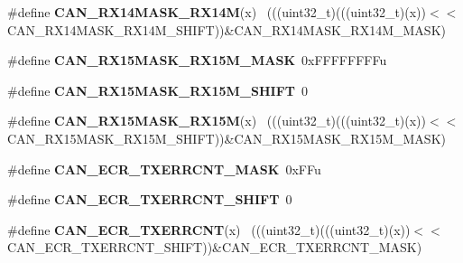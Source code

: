 \begin{DoxyCompactItemize}
\item 
\hypertarget{group___c_a_n___register___masks_gacbd7b6fc756ed286b025102797e7b562}{}\#define {\bfseries C\+A\+N\+\_\+\+R\+X14\+M\+A\+S\+K\+\_\+\+R\+X14\+M}(x)                                    ~(((uint32\+\_\+t)(((uint32\+\_\+t)(x))$<$$<$C\+A\+N\+\_\+\+R\+X14\+M\+A\+S\+K\+\_\+\+R\+X14\+M\+\_\+\+S\+H\+I\+F\+T))\&C\+A\+N\+\_\+\+R\+X14\+M\+A\+S\+K\+\_\+\+R\+X14\+M\+\_\+\+M\+A\+S\+K)\label{group___c_a_n___register___masks_gacbd7b6fc756ed286b025102797e7b562}

\item 
\hypertarget{group___c_a_n___register___masks_gaf81f33076f662d5f4c737076e36e93b7}{}\#define {\bfseries C\+A\+N\+\_\+\+R\+X15\+M\+A\+S\+K\+\_\+\+R\+X15\+M\+\_\+\+M\+A\+S\+K}~0x\+F\+F\+F\+F\+F\+F\+F\+Fu\label{group___c_a_n___register___masks_gaf81f33076f662d5f4c737076e36e93b7}

\item 
\hypertarget{group___c_a_n___register___masks_ga1420efdd894578fe2a31563c25b58e59}{}\#define {\bfseries C\+A\+N\+\_\+\+R\+X15\+M\+A\+S\+K\+\_\+\+R\+X15\+M\+\_\+\+S\+H\+I\+F\+T}~0\label{group___c_a_n___register___masks_ga1420efdd894578fe2a31563c25b58e59}

\item 
\hypertarget{group___c_a_n___register___masks_ga442945803e790f2d1173abcee249ae7e}{}\#define {\bfseries C\+A\+N\+\_\+\+R\+X15\+M\+A\+S\+K\+\_\+\+R\+X15\+M}(x)                                    ~(((uint32\+\_\+t)(((uint32\+\_\+t)(x))$<$$<$C\+A\+N\+\_\+\+R\+X15\+M\+A\+S\+K\+\_\+\+R\+X15\+M\+\_\+\+S\+H\+I\+F\+T))\&C\+A\+N\+\_\+\+R\+X15\+M\+A\+S\+K\+\_\+\+R\+X15\+M\+\_\+\+M\+A\+S\+K)\label{group___c_a_n___register___masks_ga442945803e790f2d1173abcee249ae7e}

\item 
\hypertarget{group___c_a_n___register___masks_gae4da1b026e86291036b8b7d7e78bffa7}{}\#define {\bfseries C\+A\+N\+\_\+\+E\+C\+R\+\_\+\+T\+X\+E\+R\+R\+C\+N\+T\+\_\+\+M\+A\+S\+K}~0x\+F\+Fu\label{group___c_a_n___register___masks_gae4da1b026e86291036b8b7d7e78bffa7}

\item 
\hypertarget{group___c_a_n___register___masks_ga4f1e9e374563ef6c0502d1a441caf396}{}\#define {\bfseries C\+A\+N\+\_\+\+E\+C\+R\+\_\+\+T\+X\+E\+R\+R\+C\+N\+T\+\_\+\+S\+H\+I\+F\+T}~0\label{group___c_a_n___register___masks_ga4f1e9e374563ef6c0502d1a441caf396}

\item 
\hypertarget{group___c_a_n___register___masks_ga821c6b239c15bbb81da5c7abe4c92841}{}\#define {\bfseries C\+A\+N\+\_\+\+E\+C\+R\+\_\+\+T\+X\+E\+R\+R\+C\+N\+T}(x)                                        ~(((uint32\+\_\+t)(((uint32\+\_\+t)(x))$<$$<$C\+A\+N\+\_\+\+E\+C\+R\+\_\+\+T\+X\+E\+R\+R\+C\+N\+T\+\_\+\+S\+H\+I\+F\+T))\&C\+A\+N\+\_\+\+E\+C\+R\+\_\+\+T\+X\+E\+R\+R\+C\+N\+T\+\_\+\+M\+A\+S\+K)\label{group___c_a_n___register___masks_ga821c6b239c15bbb81da5c7abe4c92841}


\end{DoxyCompactItemize}
